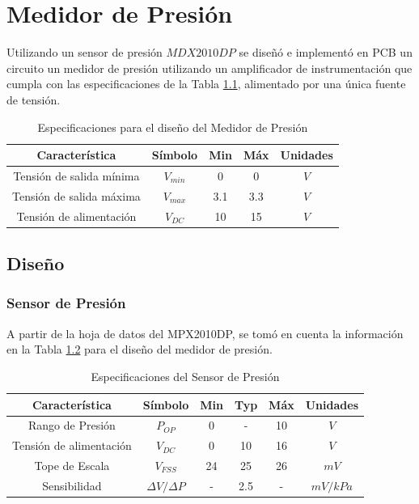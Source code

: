 \chapter{Medidor de Presión}
Utilizando un sensor de presión $MDX2010DP$ se diseñó e implementó en PCB un circuito un medidor de presión utilizando un amplificador de instrumentación que cumpla con las especificaciones de la Tabla \ref{e4:tab_specs}, alimentado por una única fuente de tensión.

\begin{table}[ht]
\begin{center}
\begin{tabular}{||c|c||c|c|c||}
\hline
Característica				&Símbolo	&Min	&Máx	&Unidades \\
\hline
Tensión de salida mínima	&$V_{min}$	&0		&0		&$V$ \\
Tensión de salida máxima	&$V_{max}$	&3.1	&3.3	&$V$ \\
Tensión de alimentación		&$V_{DC}$	&10		&15		&$V$ \\
\hline
\end{tabular}
\caption{Especificaciones para el diseño del Medidor de Presión}
\label{e4:tab_specs}
\end{center}
\end{table}

\section{Diseño}
\subsection{Sensor de Presión}
A partir de la hoja de datos del MPX2010DP, se tomó en cuenta la información en la Tabla \ref{e4:tab_sensor_specs} para el diseño del medidor de presión.

\begin{table}[ht]
\begin{center}
\begin{tabular}{||c|c||c|c|c|c||}
\hline
Característica				&Símbolo				&Min		&Typ	&Máx		&Unidades \\
\hline
Rango de Presión			&$P_{OP}$				&0		&-	&10		&$V$ \\
Tensión de alimentación		&$V_{DC}$				&0		&10	&16		&$V$ \\
Tope de Escala				&$V_{FSS}$			&24		&25	&26		&$mV$ \\
Sensibilidad				&$\Delta V / \Delta P$ 	&-		&2.5	&-		&$mV/kPa$\\
\hline
\end{tabular}
\caption{Especificaciones del Sensor de Presión}
\label{e4:tab_sensor_specs}
\end{center}
\end{table}

